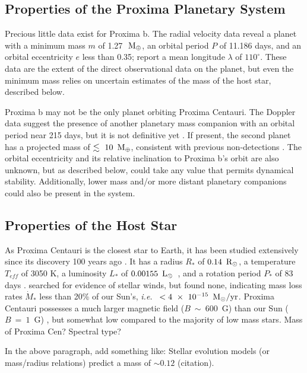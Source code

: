 \documentclass[preprint,12pt]{aastex}
\newcommand{\xxx}[1]{{\color{red} #1}} %
\def\mearth{{\rm\,M_\oplus}}
\def\msun{{\rm\,M_\odot}}
\def\rsun{{\rm\,R_\odot}}
\def\lsun{{\rm\,L_\odot}}
\def\ie{{\it i.e.\ }}
\begin{document}
\subsection{Properties of the Proxima Planetary System}
\label{sec:obs:planetsys}
Precious little data exist for Proxima b. The radial velocity data
reveal a planet with a minimum mass $m$ of 1.27~$\mearth$, an orbital period $P$
of 11.186 days, and an orbital eccentricity $e$ less than 0.35;
\cite{AngladaEscude16} report a mean longitude $\lambda$ of $110^\circ$. These
data are the extent of the direct observational data on the planet,
but even the minimum mass relies on uncertain estimates of the mass of
the host star, described below.

Proxima b may not be the only planet orbiting Proxima
Centauri. The Doppler data suggest the presence of another planetary
mass companion with an orbital period near 215 days, but it is not
definitive yet \citep{AngladaEscude16}. If present, the \xxx{second} planet has a
projected mass of $\lesssim~10~\mearth$, consistent with previous
non-detections \citep{EndlKurster08,Barnes14,Lurie14}. The orbital
eccentricity and its relative inclination to Proxima b's orbit are also
unknown, but as described below, could take any value that permits
dynamical stability. Additionally, lower mass and/or more distant
planetary companions could also be present in the system.

\subsection{Properties of the Host Star}
\label{sec:obs:star}
As Proxima Centauri is the closest star to Earth, it has been studied
extensively since its discovery 100 years ago \citep{Innes1915}.  It
has a radius $R_*$ of $0.14~\rsun$, a temperature $T_{eff}$ of 3050 K, a
luminosity $L_*$ of $0.00155~\lsun$~\citep{Boyajian12}, and a rotation
period $P_*$ of 83 days \citep{Benedict98}. \cite{Wood01} searched for
evidence of stellar winds, but found none, indicating mass loss rates
$\dot{M}_*$ less than 20\% of our Sun's, \ie
$<4~\times~10^{-15}~\msun/\textrm{yr}$. Proxima Centauri possesses a
much larger magnetic field ($B~\sim~600$~G) than our Sun ($B~=~1$~G)
\citep{ReinersBasri08}, but somewhat low compared to the majority of
low mass stars. \xxx{Mass of Proxima Cen? Spectral type?}

\xxx{In the above paragraph, add something like: Stellar evolution models (or mass/radius relations)
predict a mass of $\sim 0.12$ (citation).}
\end{document}
